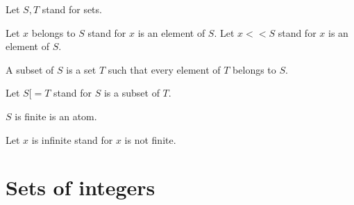 \documentclass{article}
\begin{document}
  \begin{forthel}

    Let $S,T$ stand for sets.

    Let $x$ belongs to $S$ stand for $x$ is an element of $S$.
    Let $x << S$ stand for $x$ is an element of $S$.

    \begin{definition}[Subset]
      A subset of $S$ is a set $T$ such that every element of $T$ belongs to $S$.
    \end{definition}

    Let $S [= T$ stand for $S$ is a subset of $T$.

    \begin{signature}[FinSet]
      $S$ is finite is an atom.
    \end{signature}

    Let $x$ is infinite stand for $x$ is not finite.
  \end{forthel}


  \section{Sets of integers}
\end{document}
